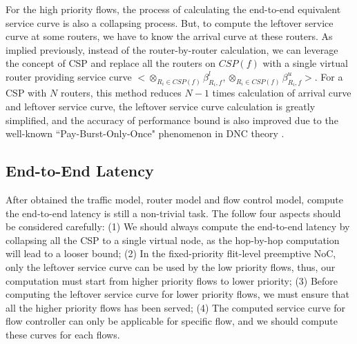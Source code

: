\documentclass[10pt,journal]{IEEEtran}
\begin{document}
For the high priority flows, the process of calculating the end-to-end equivalent service curve is also a collapsing process. But, to compute the leftover service curve at some routers, we have to know the arrival curve at these routers. As implied previously, instead of the router-by-router calculation, we can leverage the concept of CSP and replace all the routers on $CSP(f)$ with a single virtual router providing service curve $<\otimes_{R_i\in CSP(f)}\beta_{R_i,f}^l,\otimes_{R_i\in CSP(f)}\beta_{R_i,f}^u>$. For a CSP with $N$ routers, this method reduces $N-1$ times calculation of arrival curve and leftover service curve, the leftover service curve calculation is greatly simplified, and the accuracy of performance bound is also improved due to the well-known ``Pay-Burst-Only-Once" phenomenon in DNC theory \cite{Boudec2001Network}.

\subsection{End-to-End Latency}
After obtained the traffic model, router model and flow control model, compute the end-to-end latency is still a non-trivial task. The follow four aspects should be considered carefully: (1) We should always compute the end-to-end latency by collapsing all the CSP to a single virtual node, as the hop-by-hop computation will lead to a looser bound; (2) In the fixed-priority flit-level preemptive NoC, only the leftover service curve can be used by the low priority flows, thus, our computation must start from higher priority flows to lower priority; (3) Before computing the leftover service curve for lower priority flows, we must ensure that all the higher priority flows has been served; (4) The computed service curve for flow controller can only be applicable for specific flow, and we should compute these curves for each flows.
\end{document}
